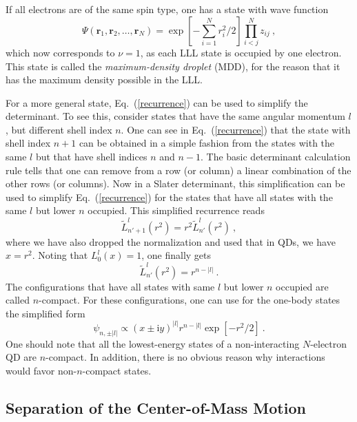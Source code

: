 \documentclass{article}
\begin{document}
If all electrons are of the same spin type, one has a state with wave
function
\begin{equation}
\Psi(\mathbf{r}_1,\mathbf{r}_2,\dots,\mathbf{r}_N) =
\exp\left[-\sum_{i=1}^N r_i^2/2\right] \prod_{i<j}^N z_{ij} \ ,
\label{mddwf}
\end{equation}
which now corresponds to $\nu=1$, as each LLL state is occupied by one
electron. This state is called the {\sl maximum-density droplet}
(MDD), for the reason that it has the maximum density possible in the
LLL\cite{macdonald}.

For a more general state, Eq.~(\ref{recurrence}) can be used to
simplify the determinant. To see this, consider states that have the
same angular momentum $l$, but different shell index $n$. One can see
in Eq.~(\ref{recurrence}) that the state with shell index $n+1$ can be
obtained in a simple fashion from the states with the same $l$ but
that have shell indices $n$ and $n-1$. The basic determinant
calculation rule tells that one can remove from a row (or column) a
linear combination of the other rows (or columns). Now in a Slater
determinant, this simplification can be used to simplify
Eq.~(\ref{recurrence}) for the states that have all states with the
same $l$ but lower $n$ occupied. This simplified recurrence reads
\begin{equation}
\tilde L_{n'+1}^l(r^2) = r^2 \tilde L_{n'}^{l}(r^2) \ ,
\label{recurrence2}
\end{equation}
where we have also dropped the normalization and used that in QDs, we have
$x=r^2$. Noting that $L_0^l(x)=1$, one finally gets
\begin{equation}
\tilde L_{n'}^l(r^2) = r^{n-|l|} \ .
\end{equation}
The configurations that have all states with same $l$ but lower $n$ occupied
are called $n$-compact. For these configurations, one can use for the one-body
states the simplified form
\begin{equation}
\psi_{n, \pm |l|}\propto (x\pm{\mathrm i}y)^{|l|} r^{n-|l|}
 \exp[-{r^2}/{2}] \ .
\label{simplewf}
\end{equation}
One should note that all the lowest-energy states of a non-interacting
$N$-electron QD are $n$-compact. In addition, there is no obvious
reason why interactions would favor non-$n$-compact states.

\subsection{Separation of the Center-of-Mass Motion}
\end{document}
